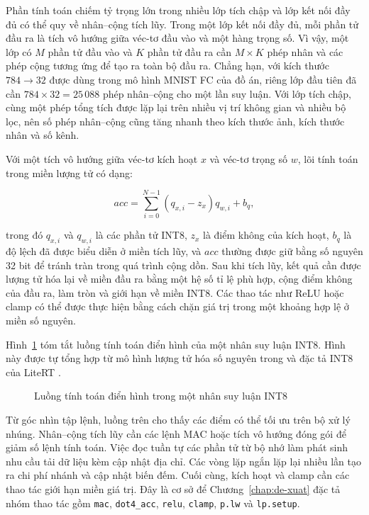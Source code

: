 \documentclass[../DoAn.tex]{subfiles}
\begin{document}
Phần tính toán chiếm tỷ trọng lớn trong nhiều lớp tích chập và lớp kết nối đầy đủ có thể quy về nhân--cộng tích lũy. Trong một lớp kết nối đầy đủ, mỗi phần tử đầu ra là tích vô hướng giữa véc-tơ đầu vào và một hàng trọng số. Vì vậy, một lớp có \(M\) phần tử đầu vào và \(K\) phần tử đầu ra cần \(M \times K\) phép nhân và các phép cộng tương ứng để tạo ra toàn bộ đầu ra. Chẳng hạn, với kích thước \(784 \rightarrow 32\) được dùng trong mô hình MNIST FC của đồ án, riêng lớp đầu tiên đã cần \(784 \times 32 = 25\,088\) phép nhân--cộng cho một lần suy luận. Với lớp tích chập, cùng một phép tổng tích được lặp lại trên nhiều vị trí không gian và nhiều bộ lọc, nên số phép nhân--cộng cũng tăng nhanh theo kích thước ảnh, kích thước nhân và số kênh.

Với một tích vô hướng giữa véc-tơ kích hoạt \(x\) và véc-tơ trọng số \(w\), lõi tính toán trong miền lượng tử có dạng:

\begin{equation}
    acc = \sum_{i=0}^{N-1} (q_{x,i} - z_x) q_{w,i} + b_q,
    \label{eq:int8-dot-product}
\end{equation}

trong đó \(q_{x,i}\) và \(q_{w,i}\) là các phần tử INT8, \(z_x\) là điểm không của kích hoạt, \(b_q\) là độ lệch đã được biểu diễn ở miền tích lũy, và \(acc\) thường được giữ bằng số nguyên 32 bit để tránh tràn trong quá trình cộng dồn. Sau khi tích lũy, kết quả cần được lượng tử hóa lại về miền đầu ra bằng một hệ số tỉ lệ phù hợp, cộng điểm không của đầu ra, làm tròn và giới hạn về miền INT8. Các thao tác như ReLU hoặc clamp có thể được thực hiện bằng cách chặn giá trị trong một khoảng hợp lệ ở miền số nguyên.

Hình~\ref{fig:int8-inference-flow} tóm tắt luồng tính toán điển hình của một nhân suy luận INT8. Hình này được tự tổng hợp từ mô hình lượng tử hóa số nguyên trong \cite{jacob2018integer} và đặc tả INT8 của LiteRT \cite{google_litert_quant_spec}.

\begin{figure}[H]
    \centering
    
    \caption{Luồng tính toán điển hình trong một nhân suy luận INT8}
    \label{fig:int8-inference-flow}
\end{figure}

Từ góc nhìn tập lệnh, luồng trên cho thấy các điểm có thể tối ưu trên bộ xử lý nhúng. Nhân--cộng tích lũy cần các lệnh MAC hoặc tích vô hướng đóng gói để giảm số lệnh tính toán. Việc đọc tuần tự các phần tử từ bộ nhớ làm phát sinh nhu cầu tải dữ liệu kèm cập nhật địa chỉ. Các vòng lặp ngắn lặp lại nhiều lần tạo ra chi phí nhánh và cập nhật biến đếm. Cuối cùng, kích hoạt và clamp cần các thao tác giới hạn miền giá trị. Đây là cơ sở để Chương~\ref{chap:de-xuat} đặc tả nhóm thao tác gồm \texttt{mac}, \texttt{dot4\_acc}, \texttt{relu}, \texttt{clamp}, \texttt{p.lw} và \texttt{lp.setup}.
\end{document}
